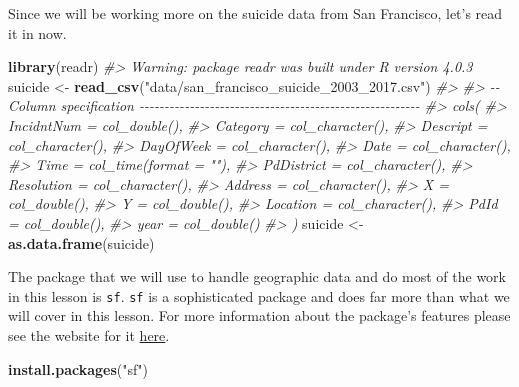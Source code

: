 \documentclass[
  12pt,
]{book}
\newenvironment{Shaded}{\begin{snugshade}}{\end{snugshade}}
\newcommand{\CommentTok}[1]{\textcolor[rgb]{0.37,0.37,0.37}{\textit{#1}}}
\newcommand{\KeywordTok}[1]{\textcolor[rgb]{0.27,0.27,0.27}{\textbf{#1}}}
\newcommand{\NormalTok}[1]{#1}
\newcommand{\StringTok}[1]{\textcolor[rgb]{0.5,0.5,0.5}{#1}}
\begin{document}
Since we will be working more on the suicide data from San Francisco, let's read it in now.

\begin{Shaded}
\begin{Highlighting}[]
\KeywordTok{library}\NormalTok{(readr)}
\CommentTok{\#\textgreater{} Warning: package \textquotesingle{}readr\textquotesingle{} was built under R version 4.0.3}
\NormalTok{suicide \textless{}{-}}\StringTok{ }\KeywordTok{read\_csv}\NormalTok{(}\StringTok{"data/san\_francisco\_suicide\_2003\_2017.csv"}\NormalTok{)}
\CommentTok{\#\textgreater{} }
\CommentTok{\#\textgreater{} {-}{-} Column specification {-}{-}{-}{-}{-}{-}{-}{-}{-}{-}{-}{-}{-}{-}{-}{-}{-}{-}{-}{-}{-}{-}{-}{-}{-}{-}{-}{-}{-}{-}{-}{-}{-}{-}{-}{-}{-}{-}{-}{-}{-}{-}{-}{-}{-}{-}{-}{-}{-}{-}{-}{-}{-}{-}{-}{-}}
\CommentTok{\#\textgreater{} cols(}
\CommentTok{\#\textgreater{}   IncidntNum = col\_double(),}
\CommentTok{\#\textgreater{}   Category = col\_character(),}
\CommentTok{\#\textgreater{}   Descript = col\_character(),}
\CommentTok{\#\textgreater{}   DayOfWeek = col\_character(),}
\CommentTok{\#\textgreater{}   Date = col\_character(),}
\CommentTok{\#\textgreater{}   Time = col\_time(format = ""),}
\CommentTok{\#\textgreater{}   PdDistrict = col\_character(),}
\CommentTok{\#\textgreater{}   Resolution = col\_character(),}
\CommentTok{\#\textgreater{}   Address = col\_character(),}
\CommentTok{\#\textgreater{}   X = col\_double(),}
\CommentTok{\#\textgreater{}   Y = col\_double(),}
\CommentTok{\#\textgreater{}   Location = col\_character(),}
\CommentTok{\#\textgreater{}   PdId = col\_double(),}
\CommentTok{\#\textgreater{}   year = col\_double()}
\CommentTok{\#\textgreater{} )}
\NormalTok{suicide \textless{}{-}}\StringTok{ }\KeywordTok{as.data.frame}\NormalTok{(suicide)}
\end{Highlighting}
\end{Shaded}

The package that we will use to handle geographic data and do most of the work in this lesson is \texttt{sf}. \texttt{sf} is a sophisticated package and does far more than what we will cover in this lesson. For more information about the package's features please see the website for it \href{http://r-spatial.github.io/sf/}{here}.

\begin{Shaded}
\begin{Highlighting}[]
\KeywordTok{install.packages}\NormalTok{(}\StringTok{"sf"}\NormalTok{)}
\end{Highlighting}
\end{Shaded}
\end{document}
